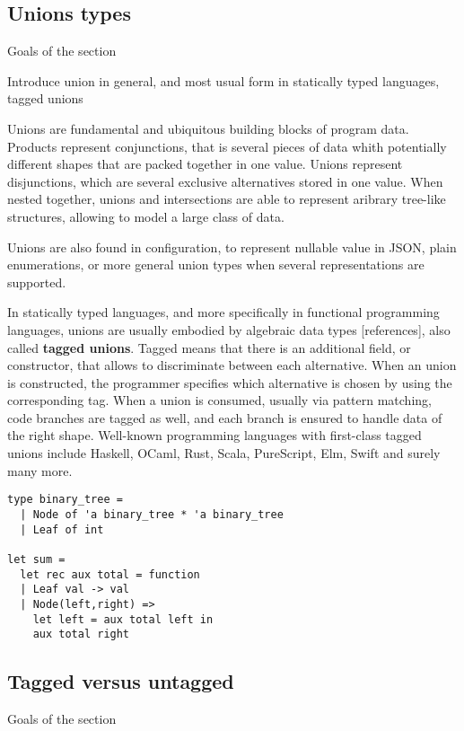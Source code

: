 \documentclass{article}
\begin{document}
\subsection{Unions types}
\color{red}Goals of the section

Introduce union in general, and most usual form in statically typed languages, tagged unions\vspace{0.5cm}\color{black}

Unions are fundamental and ubiquitous building blocks of program data. Products
represent conjunctions, that is several pieces of data whith potentially
different shapes that are packed together in one value. Unions represent
disjunctions, which are several exclusive alternatives stored in one value. When
nested together, unions and intersections are able to represent aribrary
tree-like structures, allowing to model a large class of data.

Unions are also found in configuration, to represent nullable value in JSON,
plain enumerations, or more general union types when several representations are
supported.

In statically typed languages, and more specifically in functional programming
languages, unions are usually embodied by algebraic data types [references],
also called \textbf{tagged unions}. Tagged means that there is an additional
field, or constructor, that allows to discriminate between each alternative.
When an union is constructed, the programmer specifies which alternative is
chosen by using the corresponding tag. When a union is consumed, usually via
pattern matching, code branches are tagged as well, and each branch is ensured
to handle data of the right shape. Well-known programming languages with
first-class tagged unions include Haskell, OCaml, Rust, Scala, PureScript, Elm,
Swift and surely many more.

\begin{lstlisting}[caption={Example of a binary tree as a tagged union in OCaml}, captionpos=b]
type binary_tree =
  | Node of 'a binary_tree * 'a binary_tree
  | Leaf of int

let sum =
  let rec aux total = function
  | Leaf val -> val
  | Node(left,right) =>
    let left = aux total left in
    aux total right
\end{lstlisting}

\subsection{Tagged versus untagged}
\color{red}Goals of the section
\end{document}
